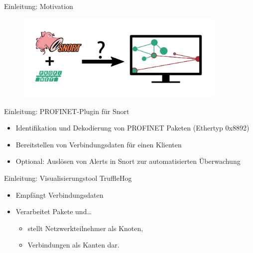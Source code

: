 \documentclass[18pt]{beamer}
\begin{document}
\begin{frame}{Einleitung: Motivation}
  	\begin{figure}
	   	\includegraphics[width=0.9\textwidth]{./images/max_4.png}
   	\end{figure}
\end{frame}

\begin{frame}{Einleitung: PROFINET-Plugin für Snort} 
	\pause
    \begin{itemize}
      \item Identifikation und Dekodierung von PROFINET Paketen (Ethertyp 0x8892)
      \pause
      \item Bereitstellen von Verbindungsdaten für einen Klienten
      \pause
      \item Optional: Auslösen von Alerts in Snort zur automatisierten Überwachung
    \end{itemize}
\end{frame}


\begin{frame}{Einleitung: Visualisierungstool TruffleHog}
	\pause
    \begin{itemize}
      \item Empfängt Verbindungsdaten
      \pause
      \item Verarbeitet Pakete und\dots
      \pause
      \begin{itemize}
        \item stellt Netzwerkteilnehmer als Knoten, \pause
        \item Verbindungen als Kanten dar.
      \end{itemize}
    \end{itemize}
\end{frame}
\end{document}

